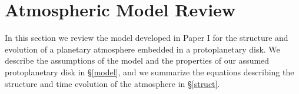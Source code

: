 \documentclass[apj]{emulateapj}
\begin{document}





\section{Atmospheric Model Review}
\label{sec2}


In this section we review the model developed in Paper I for the structure and evolution of a planetary atmosphere embedded in a protoplanetary disk. We describe the assumptions of the model and the properties of our assumed protoplanetary disk in \S\ref{model}, and we summarize the equations describing the structure and time evolution of the atmosphere in \S\ref{struct}.  
\end{document}
